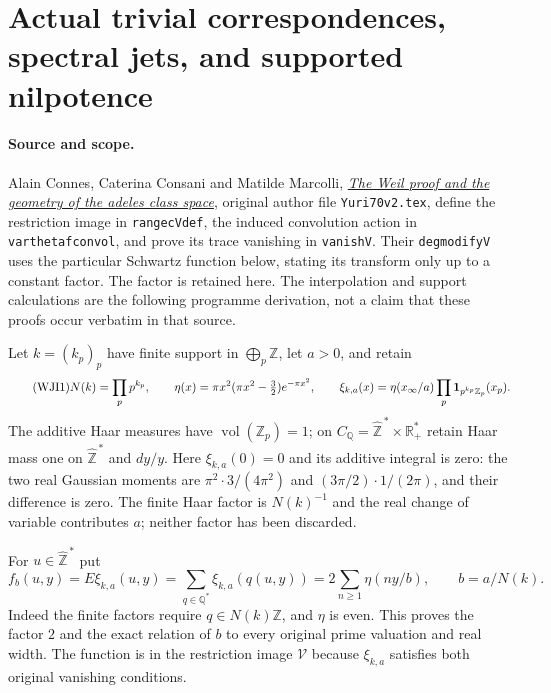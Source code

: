 \section{Actual trivial correspondences, spectral jets, and supported nilpotence}
\label{sec:cc-weil-jet-interpolation}

\paragraph{Source and scope.}
Alain Connes, Caterina Consani and Matilde Marcolli,
\href{https://arxiv.org/abs/math/0703392v1}{\emph{The Weil proof and the
geometry of the adeles class space}}, original author file
\nolinkurl{Yuri70v2.tex}, define the restriction image in
\texttt{rangecVdef}, the induced convolution action in
\texttt{varthetafconvol}, and prove its trace vanishing in
\texttt{vanishV}. Their \texttt{degmodifyV} uses the particular
Schwartz function below, stating its transform only up to a
constant factor. The factor is retained here. The interpolation
and support calculations are the following programme derivation,
not a claim that these proofs occur verbatim in that source.

Let $k=(k_p)_p$ have finite support in $\bigoplus_p\mathbb Z$,
let $a>0$, and retain
\begin{equation}\tag{WJI1}
 N(k)=\prod_p p^{k_p},\qquad
 \eta(x)=\pi x^2(\pi x^2-\tfrac32)e^{-\pi x^2},\qquad
 \xi_{k,a}(x)=\eta(x_\infty/a)
                     \prod_p{\bf1}_{p^{k_p}\mathbb Z_p}(x_p).
\end{equation}
The additive Haar measures have
$\operatorname{vol}(\mathbb Z_p)=1$; on
$C_{\mathbb Q}=\widehat{\mathbb Z}^{\,*}\times\mathbb R_+^*$
retain Haar mass one on $\widehat{\mathbb Z}^{\,*}$ and $dy/y$.
Here $\xi_{k,a}(0)=0$ and its additive integral is zero:
the two real Gaussian moments are
$\pi^2\cdot3/(4\pi^2)$ and $(3\pi/2)\cdot1/(2\pi)$,
and their difference is zero. The finite Haar factor is
$N(k)^{-1}$ and the real change of variable contributes $a$;
neither factor has been discarded.

For $u\in\widehat{\mathbb Z}^{\,*}$ put
\begin{equation}\tag{WJI2}
 f_b(u,y)=E\xi_{k,a}(u,y)
   =\sum_{q\in\mathbb Q^*}\xi_{k,a}(q(u,y))
   =2\sum_{n\ge1}\eta(ny/b),\qquad b=a/N(k).
\end{equation}
Indeed the finite factors require $q\in N(k)\mathbb Z$,
and $\eta$ is even. This proves the factor $2$ and the exact
relation of $b$ to every original prime valuation and real width.
The function is in the restriction image $\mathcal V$ because
$\xi_{k,a}$ satisfies both original vanishing conditions.

